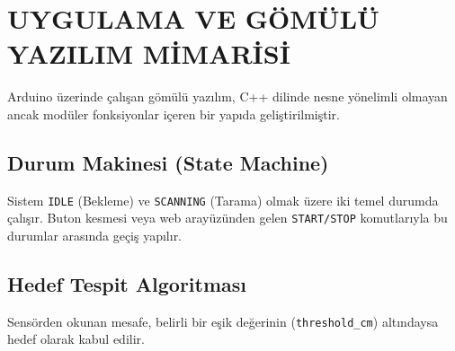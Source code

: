 ﻿\section{UYGULAMA VE GÖMÜLÜ YAZILIM MİMARİSİ}

Arduino üzerinde çalışan gömülü yazılım, C++ dilinde nesne yönelimli olmayan ancak modüler fonksiyonlar içeren bir yapıda geliştirilmiştir.

\subsection{Durum Makinesi (State Machine)}
Sistem \texttt{IDLE} (Bekleme) ve \texttt{SCANNING} (Tarama) olmak üzere iki temel durumda çalışır. Buton kesmesi veya web arayüzünden gelen \texttt{START/STOP} komutlarıyla bu durumlar arasında geçiş yapılır.

\subsection{Hedef Tespit Algoritması}
Sensörden okunan mesafe, belirli bir eşik değerinin (\texttt{threshold\_cm}) altındaysa hedef olarak kabul edilir.

